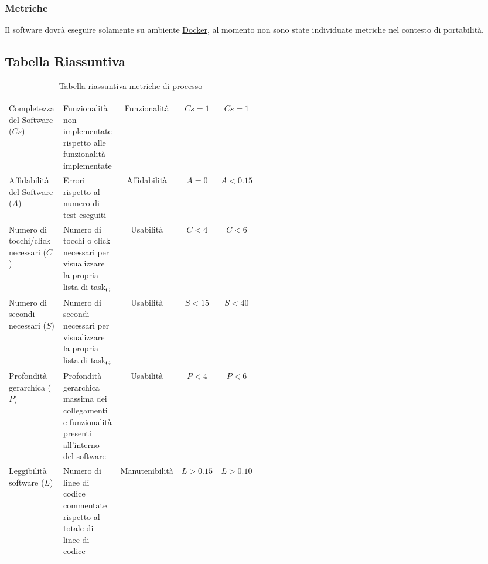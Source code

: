 \subsubsection{Metriche}
Il software dovrà eseguire solamente su ambiente \href{https://www.docker.com/why-docker}{Docker}, al momento non sono state individuate metriche nel contesto di portabilità.
\subsection{Tabella Riassuntiva}
\begin{table}[H]
	\begin{center}
		\caption{Tabella riassuntiva metriche di processo}
		\begin{tabular}{p{0.25\linewidth} p{0.25\linewidth}c!{\color[HTML]{9b240a}\vrule width 0.05cm}cc}
			\rowcolorhead
			         &                                                                            &  &  &  \\

			Completezza del Software ($Cs$)        & Funzionalità non implementate rispetto alle funzionalità implementate                               & Funzionalità                & $Cs = 1  $                 & $Cs = 1   $                  \\
			Affidabilità del Software ($A$)        & Errori rispetto al numero di test eseguiti                                                          & Affidabilità                & $A = 0   $                 & $A < 0.15 $                  \\
			Numero di tocchi/click necessari ($C$) & Numero di tocchi o click necessari per visualizzare la propria lista di task\textsubscript{G} & Usabilità                   & $C < 4   $                 & $C < 6    $                  \\
			Numero di secondi necessari ($S$)      & Numero di secondi necessari per visualizzare la propria lista di task\textsubscript{G}        & Usabilità                   & $S < 15  $                 & $S < 40   $                  \\
			Profondità gerarchica ($P$)            & Profondità gerarchica massima dei collegamenti e funzionalità presenti all'interno del software     & Usabilità                   & $P < 4   $                 & $P < 6    $                  \\
			Leggibilità software ($L$)             & Numero di linee di codice commentate rispetto al totale di linee di codice                          & Manutenibilità              & $L > 0.15$                 & $L > 0.10 $                  \\
		\end{tabular}

	\end{center}
\end{table}
